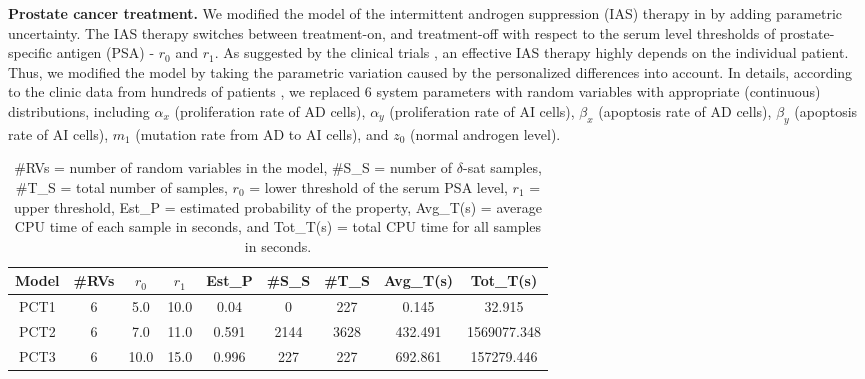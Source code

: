 {\bf\noindent Prostate cancer treatment.}
We modified the model of the intermittent androgen suppression (IAS) therapy in \cite{tanaka2010mathematical} by adding parametric uncertainty. The IAS therapy switches between  treatment-on, and treatment-off with respect to the serum level thresholds of prostate-specific antigen (PSA) - $r_0$ and $r_1$. As suggested by the clinical trials \cite{bruchovsky2006final}, an effective IAS therapy highly depends on the individual patient. Thus, we modified the model by taking the parametric variation caused by the personalized differences into account. In details, according to the clinic data from hundreds of patients \cite{bruchovsky2007locally}, we replaced 6 system 
parameters with random variables with appropriate (continuous) distributions, including $\alpha_x$ (proliferation rate of AD cells), $\alpha_y$ (proliferation rate of AI cells), $\beta_x$ (apoptosis rate of AD cells), $\beta_y$ (apoptosis rate of AI cells), $m_1$ (mutation rate from AD to AI cells), and $z_0$ (normal androgen level).
\vspace{-.5cm}
\begin{table}[th!]
\captionsetup{font=scriptsize}
\centering
    \begin{tabular}{c|c|c|c|c|c|c|c|c}
    \hline
    Model & \#RVs & $r_0$ & $r_1$ & Est\_P & \#S\_S & \#T\_S & Avg\_T(s) & Tot\_T(s) \\ \hline
    PCT1  & 6     & 5.0  & 10.0 & 0.04   & 0      & 227    & 0.145   & 32.915     \\ \hline
    PCT2  & 6     & 7.0  & 11.0 & 0.591  & 2144   & 3628   & 432.491 & 1569077.348     \\ \hline
    PCT3  & 6     & 10.0 & 15.0 & 0.996  & 227    & 227    & 692.861   & 157279.446   \\ \hline
    \end{tabular}
    \caption{\#RVs = number of random variables in the model, \#S\_S = number of $\delta$-sat samples, 
\#T\_S = total number of samples, $r_0$ = lower threshold of the serum PSA level, $r_1$ = upper threshold, 
Est\_P = estimated probability of the property,  Avg\_T(s) = average CPU time of each sample in seconds, and Tot\_T(s) = total CPU time for all samples in seconds.}
    \label{table:prostate}
\end{table}
\vspace{-1.1cm}


